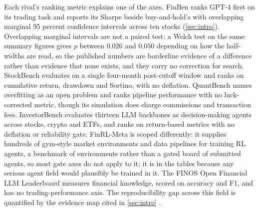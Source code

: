 Each rival's ranking metric explains one of the axes. FinBen \citep{finben2024} ranks GPT-4 first on its trading task and reports its Sharpe beside buy-and-hold's with overlapping marginal 95 percent confidence intervals across ten stocks (\cref{sec:intro}). Overlapping marginal intervals are not a paired test: a Welch test on the same summary figures gives $p$ between $0.026$ and $0.050$ depending on how the half-widths are read, so the published numbers are borderline evidence of a difference rather than evidence that none exists, and they carry no correction for search. StockBench \citep{stockbench2025} evaluates on a single four-month post-cutoff window and ranks on cumulative return, drawdown and Sortino, with no deflation. QuantBench \citep{quantbench2025} names overfitting as an open problem and ranks pipeline performance with no luck-corrected metric, though its simulation does charge commissions and transaction fees. InvestorBench \citep{investorbench2024} evaluates thirteen LLM backbones as decision-making agents across stocks, crypto and ETFs, and ranks on return-based metrics with no deflation or reliability gate. FinRL-Meta \citep{finrlmeta2022} is scoped differently: it supplies hundreds of gym-style market environments and data pipelines for training RL agents, a benchmark of environments rather than a gated board of submitted agents, so most gate axes do not apply to it; it is in the tables because any serious agent field would plausibly be trained in it. The FINOS Open Financial LLM Leaderboard \citep{openfinllm} measures financial knowledge, scored on accuracy and F1, and has no trading-performance axis. The reproducibility gap across this field is quantified by the evidence map cited in \cref{sec:intro} \citep{llmtradingaudit2026}.

